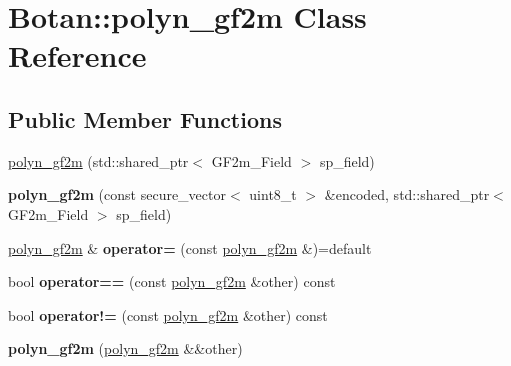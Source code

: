 \hypertarget{class_botan_1_1polyn__gf2m}{}\section{Botan\+:\+:polyn\+\_\+gf2m Class Reference}
\label{class_botan_1_1polyn__gf2m}
\subsection*{Public Member Functions}
\begin{DoxyCompactItemize}
\item 
\mbox{\hyperlink{class_botan_1_1polyn__gf2m_ae99780249cace1fef68912738bd83497}{polyn\+\_\+gf2m}} (std\+::shared\+\_\+ptr$<$ G\+F2m\+\_\+\+Field $>$ sp\+\_\+field)
\item 
\mbox{\label{class_botan_1_1polyn__gf2m_a4c0a82c1f0ced864b058a8218b56c0df}} 
{\bfseries polyn\+\_\+gf2m} (const secure\+\_\+vector$<$ uint8\+\_\+t $>$ \&encoded, std\+::shared\+\_\+ptr$<$ G\+F2m\+\_\+\+Field $>$ sp\+\_\+field)
\item 
\mbox{\label{class_botan_1_1polyn__gf2m_ab1398bbd4aeb80eebb6b6cca085380f6}} 
\mbox{\hyperlink{class_botan_1_1polyn__gf2m}{polyn\+\_\+gf2m}} \& {\bfseries operator=} (const \mbox{\hyperlink{class_botan_1_1polyn__gf2m}{polyn\+\_\+gf2m}} \&)=default
\item 
\mbox{\label{class_botan_1_1polyn__gf2m_acf6e5a8cf7cde1a88488d9ae7ca04d5b}} 
bool {\bfseries operator==} (const \mbox{\hyperlink{class_botan_1_1polyn__gf2m}{polyn\+\_\+gf2m}} \&other) const
\item 
\mbox{\label{class_botan_1_1polyn__gf2m_a30f5066e3df095ec651215cc878d2a5c}} 
bool {\bfseries operator!=} (const \mbox{\hyperlink{class_botan_1_1polyn__gf2m}{polyn\+\_\+gf2m}} \&other) const
\item 
\mbox{\label{class_botan_1_1polyn__gf2m_a474b2704b9a6c9be538bc80f97f000b7}} 
{\bfseries polyn\+\_\+gf2m} (\mbox{\hyperlink{class_botan_1_1polyn__gf2m}{polyn\+\_\+gf2m}} \&\&other)
\item 
\mbox{\label{class_botan_1_1polyn__gf2m_afcf87fa0406be9705b98ae3fbedafa88}} 

\end{DoxyCompactItemize}
